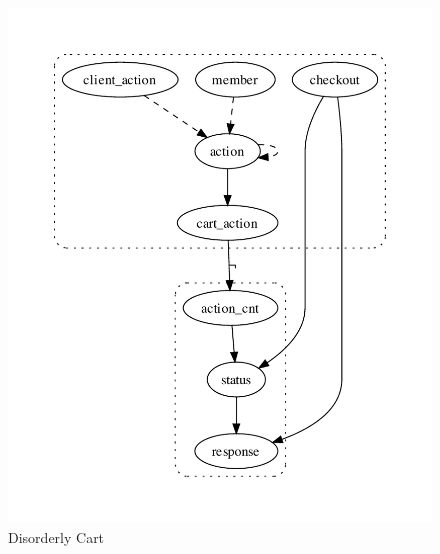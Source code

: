 \begin{figure}[t]
\centering
\includegraphics[width=0.9\linewidth]{fig/BasicCartServer_gvoutput.pdf}
\caption{Disorderly Cart}
\label{fig:pdg-disorderly}
\end{figure}






